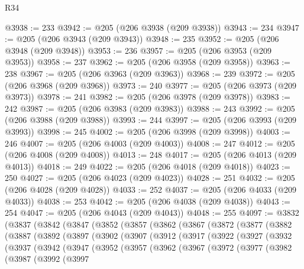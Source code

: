 \begin{lexlean}{R34}
\begin{coremodule}
@3938 := 233
@3942 := @205 (@206 @3938 (@209 @3938))
@3943 := 234
@3947 := @205 (@206 @3943 (@209 @3943))
@3948 := 235
@3952 := @205 (@206 @3948 (@209 @3948))
@3953 := 236
@3957 := @205 (@206 @3953 (@209 @3953))
@3958 := 237
@3962 := @205 (@206 @3958 (@209 @3958))
@3963 := 238
@3967 := @205 (@206 @3963 (@209 @3963))
@3968 := 239
@3972 := @205 (@206 @3968 (@209 @3968))
@3973 := 240
@3977 := @205 (@206 @3973 (@209 @3973))
@3978 := 241
@3982 := @205 (@206 @3978 (@209 @3978))
@3983 := 242
@3987 := @205 (@206 @3983 (@209 @3983))
@3988 := 243
@3992 := @205 (@206 @3988 (@209 @3988))
@3993 := 244
@3997 := @205 (@206 @3993 (@209 @3993))
@3998 := 245
@4002 := @205 (@206 @3998 (@209 @3998))
@4003 := 246
@4007 := @205 (@206 @4003 (@209 @4003))
@4008 := 247
@4012 := @205 (@206 @4008 (@209 @4008))
@4013 := 248
@4017 := @205 (@206 @4013 (@209 @4013))
@4018 := 249
@4022 := @205 (@206 @4018 (@209 @4018))
@4023 := 250
@4027 := @205 (@206 @4023 (@209 @4023))
@4028 := 251
@4032 := @205 (@206 @4028 (@209 @4028))
@4033 := 252
@4037 := @205 (@206 @4033 (@209 @4033))
@4038 := 253
@4042 := @205 (@206 @4038 (@209 @4038))
@4043 := 254
@4047 := @205 (@206 @4043 (@209 @4043))
@4048 := 255
@4097 := @3832
    (@3837
      (@3842
        (@3847
          (@3852
            (@3857
              (@3862
                (@3867
                  (@3872
                    (@3877
                      (@3882
                        (@3887
                          (@3892
                            (@3897
                              (@3902
                                (@3907
                                  (@3912
                                    (@3917
                                      (@3922
                                        (@3927
                                          (@3932
                                            (@3937
                                              (@3942
                                                (@3947
                                                  (@3952
                                                    (@3957
                                                      (@3962
                                                        (@3967
                                                          (@3972
                                                            (@3977
                                                              (@3982
                                                                (@3987
                                                                  (@3992
                                                                    (@3997

\end{coremodule}
\end{lexlean}
